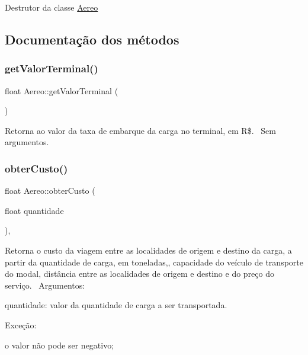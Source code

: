 Destrutor da classe \hyperlink{classAereo}{Aereo}~\newline


\subsection{Documentação dos métodos}
\mbox{\label{classAereo_a33aec047d2f25dccfdc9e90ef7f5b12e}} 
\subsubsection{\texorpdfstring{get\+Valor\+Terminal()}{getValorTerminal()}}
{\footnotesize\ttfamily float Aereo\+::get\+Valor\+Terminal (\begin{DoxyParamCaption}{ }\end{DoxyParamCaption})}

Retorna ao valor da taxa de embarque da carga no terminal, em R\$.~\newline
Sem argumentos.\mbox{\label{classAereo_aebe18688abfe40893831960f4a8889d9}} 
\subsubsection{\texorpdfstring{obter\+Custo()}{obterCusto()}}
{\footnotesize\ttfamily float Aereo\+::obter\+Custo (\begin{DoxyParamCaption}\item[{float}]{quantidade }\end{DoxyParamCaption})\hspace{0.3cm}{\ttfamily [override]}, {\ttfamily [virtual]}}

Retorna o custo da viagem entre as localidades de origem e destino da carga, a partir da quantidade de carga, em toneladas,, capacidade do veículo de transporte do modal, distância entre as localidades de origem e destino e do preço do serviço.~\newline
Argumentos\+:
\begin{DoxyItemize}
\item quantidade\+: valor da quantidade de carga a ser transportada.
\end{DoxyItemize}

Exceção\+:
\begin{DoxyItemize}
\item o valor não pode ser negativo;
\end{DoxyItemize}

